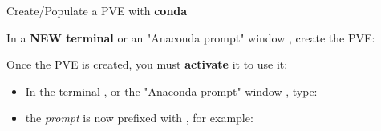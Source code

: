 \documentclass[10pt,serif,mathserif,compress,hyperref={colorlinks}]{beamer}
\begin{document}
\begin{frame}{Create/Populate a PVE with \textbf{conda}}

  \begin{tcolorbox}[title={\bf Create a conda PVE}]
    In a \textbf{NEW terminal}  or an "Anaconda prompt" window \DarkGray{\footnotesize[Windows]},
    create the  PVE:\\
    \hspace*{10pt}
  \end{tcolorbox}

  \begin{tcolorbox}[title={\bf Activate a conda PVE}]
    Once the  PVE is created, you must {\bf activate} it to use it:
    
    \begin{itemize}
    \item In the terminal , or the "Anaconda prompt" window \DarkGray{\footnotesize [Windows]}, type:\\
      \hspace*{10pt}
    \item the {\em prompt} is now prefixed with , for example:\\[-1mm]
      {\footnotesize\small
        }
    \end{itemize}
  \end{tcolorbox}
\end{frame}
  
\end{document}
